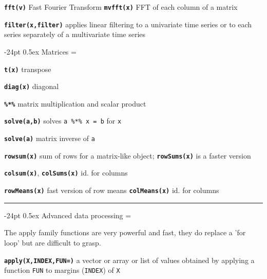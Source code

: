 \documentclass[8pt,landscape]{article}
\makeatletter
\renewcommand\section{\@startsection{section}{1}{0mm}%
                                     {-24pt}%
                                     {0.5ex}%
                                {\color{blue}\normalfont\large\bfseries}}
\newcommand{\code}{\texttt}
\newcommand{\bcode}[1]{\texttt{\textbf{#1}}}
\makeatother
\begin{document}
\begin{multicols*}{3}
\bcode{fft(v)} Fast Fourier Transform
\bcode{mvfft(x)} FFT of each column of a matrix

\bcode{filter(x,filter)} applies linear filtering to a univariate time series or to each
     series separately of a multivariate time series




\bigskip

\section{Matrices}
\everypar={\hangindent=9mm}

\bcode{t(x)} transpose

\bcode{diag(x)} diagonal

\bcode{\%*\%} matrix multiplication and scalar product

\bcode{solve(a,b)} solves \code{a \%*\% x = b} for \code{x}

\bcode{solve(a)} matrix inverse of \code{a}

\bcode{rowsum(x)} sum of rows for a matrix-like object;
\bcode{rowSums(x)} is a faster version

\bcode{colsum(x)}, \bcode{colSums(x)} id. for columns

\bcode{rowMeans(x)} fast version of row means
\bcode{colMeans(x)} id. for columns

\bigskip



\rule{.3\textwidth}{0.4pt}


\section{Advanced data processing}
\everypar={\hangindent=9mm}

The apply family functions are very powerful and fast, they do replace a 'for loop' but are difficult to grasp. 

\bcode{apply(X,INDEX,FUN=)} a vector or array or list of values obtained by applying a
     function \code{FUN} to margins (\code{INDEX}) of \code{X}


\end{multicols*}
\end{document}
